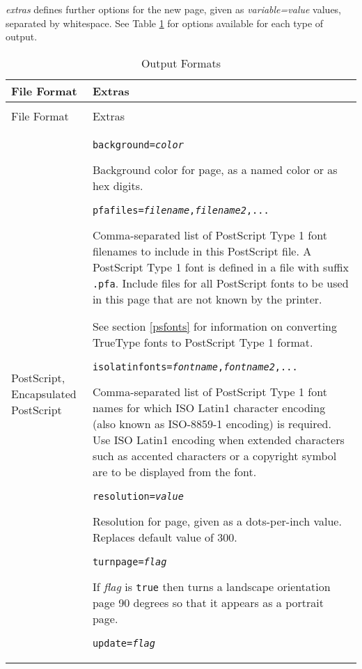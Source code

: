 \textit{extras} defines further options for the new page, given as
\textit{variable=value} values, separated by whitespace.
See Table \ref{outputformats}
for options available for each type of output.

\begin{longtable}{|p{4cm}|p{10cm}|}
\hline
\label{outputformats}
File Format & Extras \\
\hline
\hline
\endfirsthead
\hline
\caption{Output Formats} \\
\endfoot

\hline
File Format & Extras \\
\hline
\hline
\endhead

PostScript, Encapsulated PostScript &

\texttt{background=\textit{color}}

Background color for page, as a named color or as hex digits.

\vspace{10pt}
\texttt{pfafiles=\textit{filename},\textit{filename2},...}

Comma-separated list of PostScript Type 1 font filenames
to include in this PostScript file.
A PostScript Type 1 font is defined in a file
with suffix \texttt{.pfa}.  Include
files for all PostScript fonts to be used in this
page that are not known by the printer.

See section \ref{psfonts} for
information on converting TrueType fonts to PostScript Type 1 format.

\vspace{10pt}
\texttt{isolatinfonts=\textit{fontname},\textit{fontname2},...}

Comma-separated list of PostScript Type 1 font names for
which ISO Latin1 character encoding
(also known as ISO-8859-1 encoding)
is required.  Use ISO Latin1 encoding
when extended characters such as accented characters
or a copyright symbol are to be displayed from the font.

\vspace{10pt}
\texttt{resolution=\textit{value}}

Resolution for page, given as a dots-per-inch value.  Replaces
default value of 300.

\vspace{10pt}
\texttt{turnpage=\textit{flag}}

If \textit{flag} is \texttt{true} then
turns a landscape orientation page 90 degrees so that it appears
as a portrait page.

\vspace{10pt}
\texttt{update=\textit{flag}}


\end{longtable}
